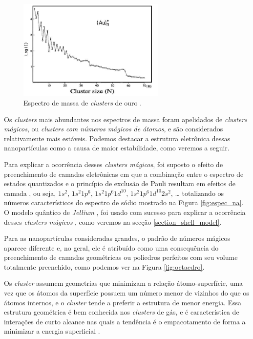 \begin{figure}
  \centering
  \includegraphics[width=0.65\textwidth]{images/clusters/espec_au}
  \vskip-0.2cm
  \caption{Espectro de massa de \textit{clusters} de ouro \cite{KATAKUSE1985229}.  }
  \label{fig:espec_au}
\end{figure}




Os \textit{clusters} mais abundantes
nos espectros de massa foram apelidados de \textit{clusters mágicos}, ou \textit{clusters com números mágicos de átomos}, e são considerados relativamente mais estáveis. Podemos destacar a estrutura eletrônica dessas nanopartículas como a causa de maior estabilidade, como veremos a seguir.

Para explicar a ocorrência desses \textit{clusters mágicos}, foi suposto o efeito de preenchimento de camadas eletrônicas em que a combinação entre o espectro de estados
quantizados e o princípio de exclusão de Pauli resultam em efeitos de camada \cite{Brack}, ou seja, $1s^{2}$, $1s^{2}1p^{6}$, $1s^{2}1p^{6}1d^{10}$, $1s^{2}1p^{6}1d^{10} 2s^{2}$, … totalizando os números característicos do espectro de sódio mostrado na Figura \ref{fig:espec_na}. O modelo quântico de \textit{Jellium} \cite{Heer}, foi usado com sucesso para explicar a ocorrência desses \textit{clusters mágicos} \cite{capitulo_livro_shell}, como veremos na secção \ref{section_shell_model}.

Para as nanopartículas consideradas grandes, o padrão de números mágicos aparece diferente e, no geral, ele é atribuído como uma consequência do preenchimento de camadas geométricas ou poliedros perfeitos com seu volume totalmente preenchido, como podemos ver na Figura \ref{fig:octaedro}.

Os \textit{cluster} assumem geometrias que minimizam a relação átomo-superfície, uma vez que os átomos da superfície possuem um número menor de vizinhos do que os átomos internos, e o \textit{cluster} tende a preferir a estrutura de menor energia. Essa estrutura geométrica é bem conhecida nos \textit{clusters} de gás, e é característica de interações de curto alcance nas quais a tendência é o empacotamento de forma a minimizar a energia superficial \cite{capitulo_livro_shell}.

